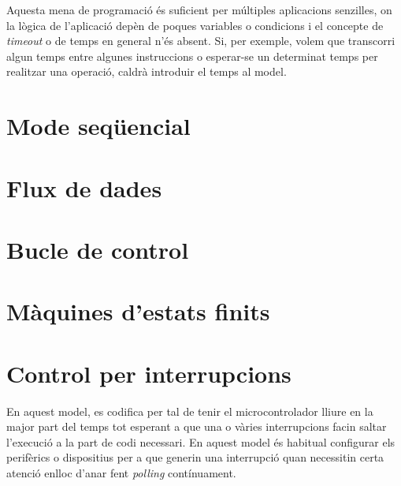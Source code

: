 Aquesta mena de programació és suficient per múltiples aplicacions senzilles, on la lògica de l'aplicació depèn de poques variables o condicions i el concepte de {\em timeout} o de temps en general n'és absent. Si, per exemple, volem que transcorri algun temps entre algunes instruccions o esperar-se un determinat temps per realitzar una operació, caldrà introduir el temps al model.

\chapter{Mode seqüencial}
\lipsum

\chapter{Flux de dades}
\lipsum

\chapter{Bucle de control}
\label{ch:buclecontrol}

\lipsum

\chapter{Màquines d'estats finits}
\label{ch:maquinesstats}

\lipsum

\chapter{Control per interrupcions}
En aquest model, es codifica per tal de tenir el microcontrolador lliure en la major part del temps tot esperant a que una o vàries interrupcions facin saltar l'execució a la part de codi necessari. En aquest model és habitual configurar els perifèrics o dispositius per a que generin una interrupció quan necessitin certa atenció enlloc d'anar fent {\em polling} contínuament.





